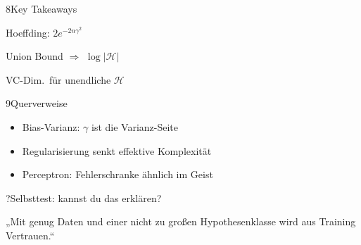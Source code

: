\begin{hngrid}
\begin{hnp}[raster multicolumn=2,acc=hnorange]{8}{Key Takeaways}
\begin{hnchk}
\item Hoeffding: $2e^{-2n\gamma^2}$
\item Union Bound $\Rightarrow$ $\log|\mathcal H|$
\item VC-Dim.\ für unendliche $\mathcal H$
\end{hnchk}
\end{hnp}
%
\begin{hnp}[raster multicolumn=2,acc=hnteal]{9}{Querverweise}
\begin{itemize}
\item Bias-Varianz: $\gamma$ ist die Varianz-Seite
\item Regularisierung senkt effektive Komplexität
\item Perceptron: Fehlerschranke ähnlich im Geist
\end{itemize}
\end{hnp}
%
\begin{hnp}[raster multicolumn=6,acc=hnpurple,colback=hnlilac!30]{?}{Selbsttest: kannst du das erklären?}
\end{hnp}
%
\begin{hnbanner}[raster multicolumn=6]
„Mit genug Daten und einer nicht zu großen Hypothesenklasse wird aus Training Vertrauen.“
\end{hnbanner}
\end{hngrid}

